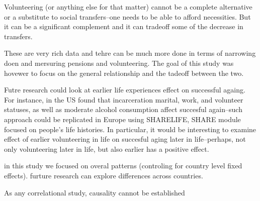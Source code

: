 \documentclass[10pt, letterpaper]{article}
\begin{document}
\begin{spacing}{1.4}
Volunteering (or anything else for that matter) cannot be a complete alternative
or a substitute to social transfers--one needs to be able to afford necessities.
But it can be a significant complement and
it can tradeoff some of the decrease in transfers.

These are very rich data and tehre can be much more done in terms of narrowing
doen and mersuring pensions and volunteering. The goal of this study was hovewer
to focus on the general relationship and the tadeoff between the two.

Futre research could look at earlier life experiences effect on successful
againg. For instance, in the US \citet{pruchno10} found that incarceration
 marital, work, and volunteer statuses, as well as moderate
alcohol consumption affect succesful again--such approach could be
replicated in Europe using SHARELIFE, SHARE module focused on people's life
histories. In particular, it would be interesting to examine effect of earlier
volunteering in life on succesful aging later in life--perhaps, not only
volunteering later in life, but also earlier has a positive effect. 


in this study we focused on overal patterns (controling for country level fixed
effects). furture research can explore differences across countries. 

As any correlational study, causality cannot be established




\end{spacing}
\end{document}
